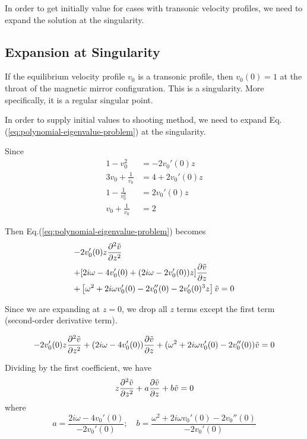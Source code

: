 In order to get initially value for cases with transonic velocity profiles, we need to expand the solution at the singularity.

\subsection{Expansion at Singularity}
If the equilibrium velocity profile $v_0$ is a transonic profile, then $v_0(0) = 1$ at the throat of the magnetic mirror configuration. This is a singularity. More specifically, it is a regular singular point. 

In order to supply initial values to shooting method, we need to expand Eq.(\ref{eq:polynomial-eigenvalue-problem}) at the singularity.

Since 
\begin{equation}
   \begin{aligned}
    1-v_0^2 &= -2v_0'(0)z\\
    3v_0 + \frac{1}{v_0} &= 4 + 2v_0'(0)z \\
    1-\frac{1}{v_0^2} &= 2v_0'(0)z \\
    v_0 + \frac{1}{v_0} &= 2
   \end{aligned} 
\end{equation}

Then Eq.(\ref{eq:polynomial-eigenvalue-problem}) becomes
\begin{equation}
    \begin{aligned}
        -& 2v_0'(0)z\pdv[2]{\tilde{v}}{z} \\
        +& [2i\omega - 4v_0'(0) + (2i\omega - 2v_0'(0))z]\pdv{\tilde{v}}{z} \\
        +& \left[\omega^2 + 2i\omega v_0'(0) - 2v_0''(0) - 2v_0'(0)^3z\right]\tilde{v}
        = 0
    \end{aligned}
    \label{eq:perturbed-equation-full}
\end{equation}

Since we are expanding at $z=0$, we drop all $z$ terms except the first term (second-order derivative term).

\[ - 2v_0'(0)z\pdv[2]{\tilde{v}}{z}
+ (2i\omega - 4v_0'(0))\pdv{\tilde{v}}{z} 
+ (\omega^2 + 2i\omega v_0'(0) - 2v_0''(0))\tilde{v}
= 0 \]

Dividing by the first coefficient, we have
\begin{equation}
    z\pdv[2]{\tilde{v}}{z} + a\pdv{\tilde{v}}{z} + b\tilde{v} = 0
    \label{eq:perturbed-equation}
\end{equation}
where
\[ a = \frac{2i\omega - 4v_0'(0)}{-2v_0'(0)}; \quad 
b = \frac{\omega^2 + 2i\omega v_0'(0) - 2v_0''(0)}{-2v_0'(0)}
\]

